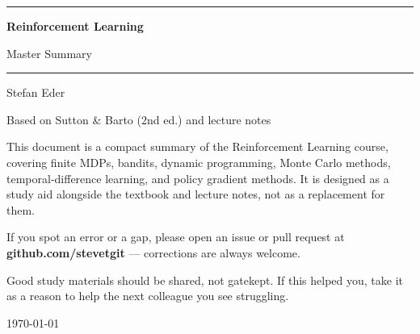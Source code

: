 \documentclass[11pt, oneside]{book}
\newcommand{\coursetitle}{Reinforcement Learning}
\newcommand{\documenttype}{Master Summary}
\newcommand{\authorname}{Stefan Eder}
\newcommand{\basedon}{Based on Sutton \& Barto (2nd ed.) and lecture notes}
\begin{document}
\frontmatter


\thispagestyle{empty}
\vspace*{1.8cm}

\begin{center}
  {\color{accent}\rule{\linewidth}{1.8pt}}
  \vspace{0.65cm}

  {\fontsize{28}{34}\selectfont\bfseries\color{accent}\coursetitle\par}
  \vspace{0.25cm}
  {\large\color{gray!80!black}\documenttype\par}

  \vspace{0.55cm}
  {\color{accent!35}\rule{\linewidth}{0.5pt}}
  \vspace{0.55cm}

  {\large\authorname\par}
  \vspace{0.2cm}
  {\small\color{gray!70}\basedon\par}
\end{center}

\vspace{1.6cm}

\begin{center}
\begin{minipage}{0.84\textwidth}
  \small\color{gray!80!black}
  This document is a compact summary of the Reinforcement Learning course,
  covering finite MDPs, bandits, dynamic programming, Monte Carlo methods,
  temporal-difference learning, and policy gradient methods.
  It is designed as a study aid alongside the textbook and lecture notes,
  not as a replacement for them.

  \medskip
  If you spot an error or a gap, please open an issue or pull request at
  \textbf{github.com/stevetgit} --- corrections are always welcome.

  \medskip
  \color{gray!60!black}
  Good study materials should be shared, not gatekept.
  If this helped you, take it as a reason to help the next colleague you see struggling.
\end{minipage}
\end{center}

\vfill
{\centering\small\color{gray!65} \today\par}
\clearpage


\setcounter{tocdepth}{2}
\end{document}
